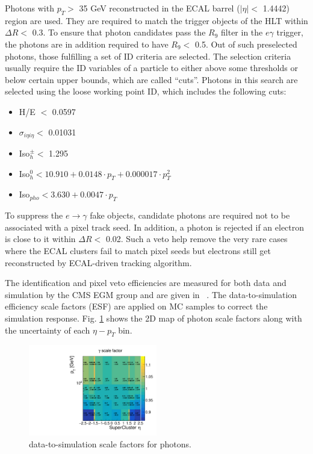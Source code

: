 \documentclass[thesis.tex]{subfiles}
\renewcommand\_{\textunderscore\allowbreak}
\begin{document}
Photons with $p_{T} >$ 35 GeV reconstructed in the ECAL barrel ($|\eta| <$ 1.4442) region are used. 
They are required to match the trigger objects of the HLT within $\Delta R <$ 0.3. 
To ensure that photon candidates pass the $R_9$ filter in the $e\gamma$ trigger, the photons are in addition required to have $R_9 <$ 0.5.
Out of such preselected photons, those fulfilling a set of ID criteria are selected.
The selection criteria usually require the ID variables of a particle to either above some thresholds or below certain upper bounds, which are called ``cuts''. 
Photons in this search are selected using the loose working point ID, which includes the following cuts: 
\begin{center}
\begin{itemize}
\item H/E $<$ 0.0597
\item $\sigma_{i\eta i\eta} <$ 0.01031 
\item Iso$_h^\pm <$ 1.295
\item Iso$_h^0 < 10.910 +0.0148 \cdot p_{T} + 0.000017 \cdot p^2_{T}$
\item Iso$_{pho} < 3.630+0.0047 \cdot p_{T}$
\end{itemize}
\end{center}

To suppress the $e\rightarrow\gamma$ fake objects, candidate photons are required not to be associated with a pixel track seed. 
In addition, a photon is rejected if an electron is close to it within $\Delta R <$ 0.02. 
Such a veto help remove the very rare cases where the ECAL clusters fail to match pixel seeds but electrons still get reconstructed by ECAL-driven tracking algorithm.

The identification and pixel veto efficiencies are measured for both data and simulation by the CMS EGM group and are given in ~\cite{EGM:leptonScale}. The data-to-simulation efficiency scale factors (ESF) are applied on MC samples to correct the simulation response. Fig. \ref{fig:photonsf} shows the 2D map of photon scale factors along with the uncertainty of each $\eta-p_T$ bin.

\begin{figure}[hbt]
	\centering
	\includegraphics[width=0.5\textwidth]{plot/SF_Photon.pdf}
	\caption{data-to-simulation scale factors for photons.}
	\label{fig:photonsf}
\end{figure}
\end{document}
